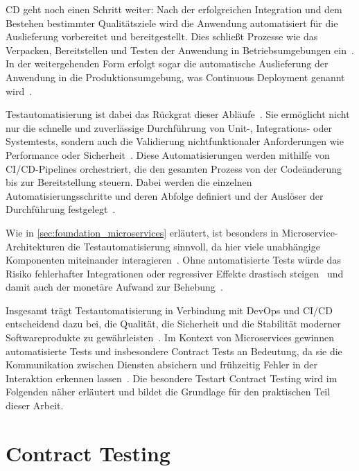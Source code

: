 \Glsdesc{CD} geht noch einen Schritt weiter: Nach der erfolgreichen Integration und dem Bestehen bestimmter Qualitätsziele wird die Anwendung automatisiert für die Auslieferung vorbereitet und bereitgestellt.
Dies schließt Prozesse wie das Verpacken, Bereitstellen und Testen der Anwendung in Betriebsumgebungen ein~\cite{humbleContinuousDelivery2012}.
In der weitergehenden Form erfolgt sogar die automatische Auslieferung der Anwendung in die Produktionsumgebung, was Continuous Deployment genannt wird~\cite{doncaMethodContinuousIntegration2022}.

Testautomatisierung ist dabei das Rückgrat dieser Abläufe~\cite{vijayakumaranDevOpsFrameworksTechniques2025}.
Sie ermöglicht nicht nur die schnelle und zuverlässige Durchführung von Unit-, Integrations- oder Systemtests, sondern auch die Validierung nichtfunktionaler Anforderungen wie Performance oder Sicherheit~\cite{cruzContractTestingAction2025}.
Diese Automatisierungen werden mithilfe von \gls{CI}/\gls{CD}-\glspl{Pipeline} orchestriert, die den gesamten Prozess von der Codeänderung bis zur Bereitstellung steuern.
Dabei werden die einzelnen Automatisierungsschritte und deren Abfolge definiert und der Auslöser der Durchführung festgelegt~\cite{vanmerodeContinuousIntegrationCI2023}.

Wie in \cref{sec:foundation_microservices} erläutert, ist besonders in Microservice-Architekturen die Testautomatisierung sinnvoll, da hier viele unabhängige Komponenten miteinander interagieren~\cite{haroMicroserviceAPIs2023}.
Ohne automatisierte Tests würde das Risiko fehlerhafter Integrationen oder regressiver Effekte drastisch steigen~\cite{vanmerodeContinuousIntegrationCI2023} und damit auch der monetäre Aufwand zur Behebung~\cite{boehmSoftwareEngineeringEconomics1984}.

Insgesamt trägt Testautomatisierung in Verbindung mit \gls{DevOps} und \gls{CI}/\gls{CD} entscheidend dazu bei, die Qualität, die Sicherheit und die Stabilität moderner Softwareprodukte zu gewährleisten~\cite{shahinContinuousIntegrationDelivery2017}.
Im Kontext von Microservices gewinnen automatisierte Tests und insbesondere Contract Tests an Bedeutung, da sie die Kommunikation zwischen Diensten absichern und frühzeitig Fehler in der Interaktion erkennen lassen~\cite{cruzContractTestingAction2025}.
Die besondere Testart Contract Testing wird im Folgenden näher erläutert und bildet die Grundlage für den praktischen Teil dieser Arbeit.

\section{Contract Testing}\label{sec:foundation_contracttesting}

